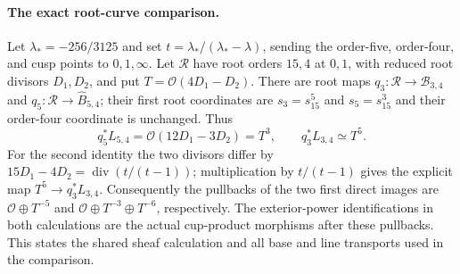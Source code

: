 \paragraph{The exact root-curve comparison.}
Let $\lambda_*=-256/3125$ and set
$t=\lambda_*/(\lambda_*-\lambda)$, sending the order-five,
order-four, and cusp points to $0,1,\infty$.  Let $\mathcal R$
have root orders $15,4$ at $0,1$, with reduced root divisors
$D_1,D_2$, and put $T=\mathcal O(4D_1-D_2)$.
There are root maps $q_3:\mathcal R\to\mathcal B_{3,4}$ and
$q_5:\mathcal R\to\widehat B_{5,4}$; their first root
coordinates are $s_3=s_{15}^5$ and $s_5=s_{15}^3$ and their
order-four coordinate is unchanged.  Thus
\[
 q_5^*L_{5,4}=\mathcal O(12D_1-3D_2)=T^3,
 \qquad q_3^*L_{3,4}\simeq T^5.
\]
For the second identity the two divisors differ by
$15D_1-4D_2=\operatorname{div}(t/(t-1))$; multiplication by $t/(t-1)$ gives the explicit map
$T^5\to q_3^*L_{3,4}$.
Consequently the pullbacks of the two first direct images are
$\mathcal O\oplus T^{-5}$ and
$\mathcal O\oplus T^{-3}\oplus T^{-6}$, respectively.
The exterior-power identifications in both calculations are
the actual cup-product morphisms after these pullbacks.
This states the shared sheaf calculation and all base and
line transports used in the comparison.
